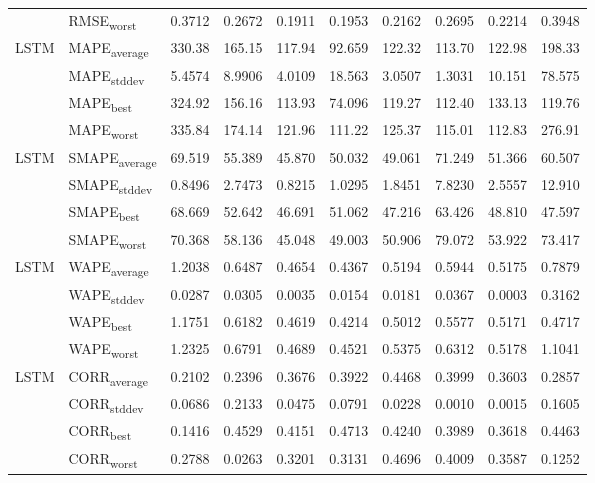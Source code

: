 {\begin{longtable}{l l c c c c c c c c}
 & RMSE\textsubscript{worst} & 0.3712 & 0.2672 & 0.1911 & 0.1953 & 0.2162 & 0.2695 & 0.2214 & 0.3948 \\
\cmidrule(lr){2-10}
\multirow{4}{*}{LSTM} & MAPE\textsubscript{average} & 330.38 & 165.15 & 117.94 & 92.659 & 122.32 & 113.70 & 122.98 & 198.33 \\
 & MAPE\textsubscript{stddev} & 5.4574 & 8.9906 & 4.0109 & 18.563 & 3.0507 & 1.3031 & 10.151 & 78.575 \\
 & MAPE\textsubscript{best} & 324.92 & 156.16 & 113.93 & 74.096 & 119.27 & 112.40 & 133.13 & 119.76 \\
 & MAPE\textsubscript{worst} & 335.84 & 174.14 & 121.96 & 111.22 & 125.37 & 115.01 & 112.83 & 276.91 \\
\cmidrule(lr){2-10}
\multirow{4}{*}{LSTM} & SMAPE\textsubscript{average} & 69.519 & 55.389 & 45.870 & 50.032 & 49.061 & 71.249 & 51.366 & 60.507 \\
 & SMAPE\textsubscript{stddev} & 0.8496 & 2.7473 & 0.8215 & 1.0295 & 1.8451 & 7.8230 & 2.5557 & 12.910 \\
 & SMAPE\textsubscript{best} & 68.669 & 52.642 & 46.691 & 51.062 & 47.216 & 63.426 & 48.810 & 47.597 \\
 & SMAPE\textsubscript{worst} & 70.368 & 58.136 & 45.048 & 49.003 & 50.906 & 79.072 & 53.922 & 73.417 \\
\cmidrule(lr){2-10}
\multirow{4}{*}{LSTM} & WAPE\textsubscript{average} & 1.2038 & 0.6487 & 0.4654 & 0.4367 & 0.5194 & 0.5944 & 0.5175 & 0.7879 \\
 & WAPE\textsubscript{stddev} & 0.0287 & 0.0305 & 0.0035 & 0.0154 & 0.0181 & 0.0367 & 0.0003 & 0.3162 \\
 & WAPE\textsubscript{best} & 1.1751 & 0.6182 & 0.4619 & 0.4214 & 0.5012 & 0.5577 & 0.5171 & 0.4717 \\
 & WAPE\textsubscript{worst} & 1.2325 & 0.6791 & 0.4689 & 0.4521 & 0.5375 & 0.6312 & 0.5178 & 1.1041 \\
\cmidrule(lr){2-10}
\multirow{4}{*}{LSTM} & CORR\textsubscript{average} & 0.2102 & 0.2396 & 0.3676 & 0.3922 & 0.4468 & 0.3999 & 0.3603 & 0.2857 \\
 & CORR\textsubscript{stddev} & 0.0686 & 0.2133 & 0.0475 & 0.0791 & 0.0228 & 0.0010 & 0.0015 & 0.1605 \\
 & CORR\textsubscript{best} & 0.1416 & 0.4529 & 0.4151 & 0.4713 & 0.4240 & 0.3989 & 0.3618 & 0.4463 \\
 & CORR\textsubscript{worst} & 0.2788 & 0.0263 & 0.3201 & 0.3131 & 0.4696 & 0.4009 & 0.3587 & 0.1252 \\

\end{longtable}}
